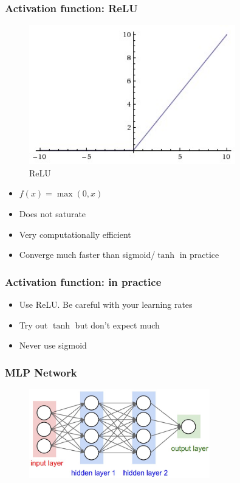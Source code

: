 \documentclass{beamer}
\begin{document}
\begin{frame}
  \frametitle{Activation function: ReLU}
  \begin{minipage}{0.48\textwidth}
    \begin{figure}
      \centering
      \includegraphics[width=0.8\textwidth]{relu.jpeg}
      \caption{ReLU}
    \end{figure}
  \end{minipage}
  \begin{minipage}{0.48\textwidth}
    \begin{itemize}
      \item $f(x)=\max(0,x)$
      \item[\ding{51}] Does not saturate
      \item[\ding{51}] Very computationally efficient
      \item[\ding{51}] Converge much faster than sigmoid/$\tanh$ in practice
    \end{itemize}
  \end{minipage}
\end{frame}

\begin{frame}
  \frametitle{Activation function: in practice}
  \begin{itemize}
    \item[\ding{65}] Use ReLU. Be careful with your learning rates
    \item[\ding{65}] Try out $\tanh$ but don't expect much
    \item[\ding{65}] Never use sigmoid
  \end{itemize}
\end{frame}

\begin{frame}
  \frametitle{MLP Network}
  
  \begin{figure}
    \centering
    \includegraphics[width=0.7\textwidth]{neural_net.jpeg}
  \end{figure}
\end{frame}
\end{document}
